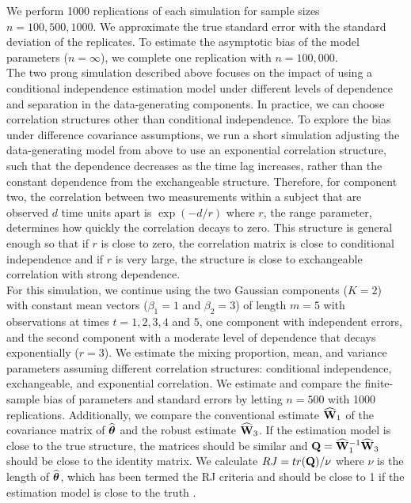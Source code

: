 We perform 1000 replications of each simulation for sample sizes $n=100, 500, 1000$. We approximate the true standard error with the standard deviation of the replicates. To estimate the asymptotic bias of the model parameters ($n=\infty$), we complete one replication with $n=100,000$.\\

The two prong simulation described above focuses on the impact of using a conditional independence estimation model under different levels of dependence and separation in the data-generating components. In practice, we can choose correlation structures other than conditional independence. To explore the bias under difference covariance assumptions, we run a short simulation adjusting the data-generating model from above to use an exponential correlation structure, such that the dependence decreases as the time lag increases, rather than the constant dependence from the exchangeable structure. Therefore, for component two, the correlation between two measurements within a subject that are observed $d$ time units apart is $\exp(-d/r)$ where $r$, the range parameter, determines how quickly the correlation decays to zero. This structure is general enough so that if $r$ is close to zero, the correlation matrix is close to conditional independence and if $r$ is very large, the structure is close to exchangeable correlation with strong dependence. \\

For this simulation, we continue using the two Gaussian components ($K = 2$) with constant mean vectors ($\beta_{1}=1$ and $\beta_{2}=3$) of length $m=5$ with observations at times $t=1,2,3,4$ and $5$, one component with independent errors, and the second component with a moderate level of dependence that decays exponentially ($r=3$). We estimate the mixing proportion, mean, and variance parameters assuming different correlation structures: conditional independence, exchangeable, and exponential correlation. We estimate and compare the finite-sample bias of parameters and standard errors by letting $n=500$ with 1000 replications. Additionally, we compare the conventional estimate $\widehat{\mathbf W}_{1}$ of the covariance matrix of $\widehat{\boldsymbol \theta}$ and the robust estimate $\widehat{\mathbf W}_{3}$. If the estimation model is close to the true structure, the matrices should be similar and $\mathbf Q = \widehat{\mathbf W}_{1}^{-1}\widehat{\mathbf W}_{3}$ should be close to the identity matrix. We calculate $RJ=tr(\mathbf Q)/\nu$ where $\nu$ is the length of $\widehat{\boldsymbol\theta}$, which has been termed the RJ criteria and should be close to 1 if the estimation model is close to the truth \cite{shults2009,rotnitzky1990}.


